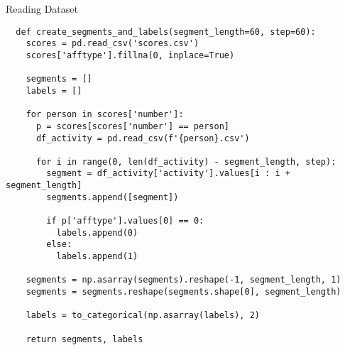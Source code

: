 \begin{code}
  \caption{Reading Dataset}
  \label{code:reading_dataset}
  
  \begin{verbatim}
  def create_segments_and_labels(segment_length=60, step=60):
    scores = pd.read_csv('scores.csv')
    scores['afftype'].fillna(0, inplace=True)
    
    segments = []
    labels = []

    for person in scores['number']:
      p = scores[scores['number'] == person]
      df_activity = pd.read_csv(f'{person}.csv')

      for i in range(0, len(df_activity) - segment_length, step):
        segment = df_activity['activity'].values[i : i + segment_length]
        segments.append([segment])

        if p['afftype'].values[0] == 0: 
          labels.append(0)
        else:
          labels.append(1)

    segments = np.asarray(segments).reshape(-1, segment_length, 1)
    segments = segments.reshape(segments.shape[0], segment_length)

    labels = to_categorical(np.asarray(labels), 2)
    
    return segments, labels
  \end{verbatim}
\end{code}
